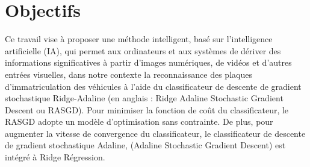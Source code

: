 	\section{Objectifs}
		Ce travail vise à proposer une méthode intelligent, basé sur l'intelligence artificielle (IA), qui permet aux ordinateurs et aux systèmes de dériver des informations significatives à partir d'images numériques, de vidéos et d'autres entrées visuelles, dans notre contexte la reconnaissance des plaques d’immatriculation des véhicules à l'aide du classificateur de descente de gradient stochastique Ridge-Adaline (en anglais : Ridge Adaline Stochastic Gradient Descent ou RASGD).
		Pour minimiser la fonction de coût du classificateur, le RASGD adopte un modèle d'optimisation sans contrainte. De plus, pour augmenter la vitesse de convergence du classificateur, le classificateur de descente de gradient stochastique Adaline, (Adaline Stochastic Gradient Descent) est intégré à Ridge Régression.\cite{deepa2021ai}
		
		
		